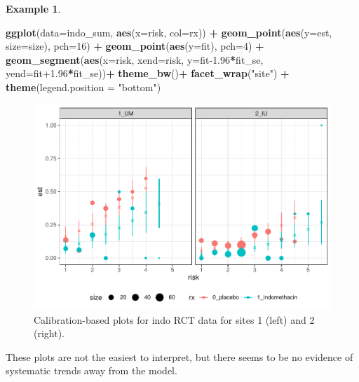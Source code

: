 \documentclass[
  openany]{book}
\newenvironment{Shaded}{\begin{snugshade}}{\end{snugshade}}
\newcommand{\AttributeTok}[1]{\textcolor[rgb]{0.13,0.29,0.53}{#1}}
\newcommand{\DecValTok}[1]{\textcolor[rgb]{0.00,0.00,0.81}{#1}}
\newcommand{\FloatTok}[1]{\textcolor[rgb]{0.00,0.00,0.81}{#1}}
\newcommand{\FunctionTok}[1]{\textcolor[rgb]{0.13,0.29,0.53}{\textbf{#1}}}
\newcommand{\NormalTok}[1]{#1}
\newcommand{\SpecialCharTok}[1]{\textcolor[rgb]{0.81,0.36,0.00}{\textbf{#1}}}
\newcommand{\StringTok}[1]{\textcolor[rgb]{0.31,0.60,0.02}{#1}}
\theoremstyle{definition}
\theoremstyle{definition}
\newtheorem{example}{Example}[chapter]
\theoremstyle{definition}
\theoremstyle{definition}
\theoremstyle{remark}
\begin{document}
\begin{example}
\begin{Shaded}
\begin{Highlighting}[]
\FunctionTok{ggplot}\NormalTok{(}\AttributeTok{data=}\NormalTok{indo\_sum, }\FunctionTok{aes}\NormalTok{(}\AttributeTok{x=}\NormalTok{risk, }\AttributeTok{col=}\NormalTok{rx)) }\SpecialCharTok{+}
  \FunctionTok{geom\_point}\NormalTok{(}\FunctionTok{aes}\NormalTok{(}\AttributeTok{y=}\NormalTok{est, }\AttributeTok{size=}\NormalTok{size), }\AttributeTok{pch=}\DecValTok{16}\NormalTok{) }\SpecialCharTok{+} 
  \FunctionTok{geom\_point}\NormalTok{(}\FunctionTok{aes}\NormalTok{(}\AttributeTok{y=}\NormalTok{fit), }\AttributeTok{pch=}\DecValTok{4}\NormalTok{) }\SpecialCharTok{+}
  \FunctionTok{geom\_segment}\NormalTok{(}\FunctionTok{aes}\NormalTok{(}\AttributeTok{x=}\NormalTok{risk, }\AttributeTok{xend=}\NormalTok{risk, }\AttributeTok{y=}\NormalTok{fit}\FloatTok{{-}1.96}\SpecialCharTok{*}\NormalTok{fit\_se, }\AttributeTok{yend=}\NormalTok{fit}\FloatTok{+1.96}\SpecialCharTok{*}\NormalTok{fit\_se))}\SpecialCharTok{+}
  \FunctionTok{theme\_bw}\NormalTok{()}\SpecialCharTok{+}
  \FunctionTok{facet\_wrap}\NormalTok{(}\StringTok{"site"}\NormalTok{) }\SpecialCharTok{+} \FunctionTok{theme}\NormalTok{(}\AttributeTok{legend.position =} \StringTok{"bottom"}\NormalTok{)}
\end{Highlighting}
\end{Shaded}

\begin{figure}
\centering
\includegraphics{CT4H_notes_files/figure-latex/unnamed-chunk-44-1.pdf}
\caption{\label{fig:unnamed-chunk-44}Calibration-based plots for indo RCT data for sites 1 (left) and 2 (right).}
\end{figure}

These plots are not the easiest to interpret, but there seems to be no evidence of systematic trends away from the model.
\end{example}
\end{document}
